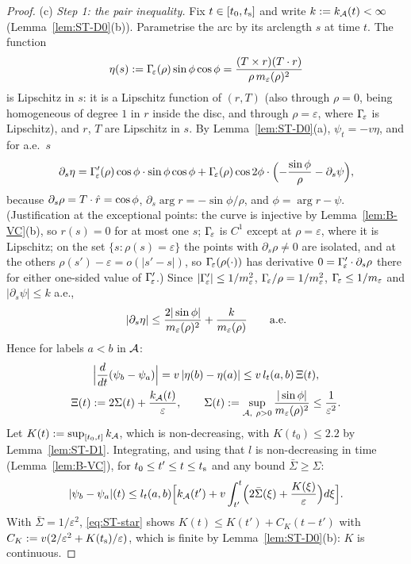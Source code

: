 \begin{proof}
(c) \emph{Step 1: the pair inequality.} Fix $t\in[t_0,t_{\mathrm s}]$ and write $k:=k_{\mathcal A}(t)<\infty$ (Lemma~\ref{lem:ST-D0}(b)).
Parametrise the arc by its arclength $s$ at time $t$. The function
\[
\eta(s):=\Gamma_{\!\varepsilon}(\rho)\sin\phi\cos\phi=\frac{(T\times r)(T\cdot r)}{\rho\,m_\varepsilon(\rho)^2}
\]
is Lipschitz in $s$: it is a Lipschitz function of $(r,T)$ (also through $\rho=0$, being homogeneous of degree $1$ in $r$ inside
the disc, and through $\rho=\varepsilon$, where $\Gamma_{\!\varepsilon}$ is Lipschitz), and $r$, $T$ are Lipschitz in $s$. By
Lemma~\ref{lem:ST-D0}(a), $\psi_t=-v\eta$, and for a.e.\ $s$
\[
\partial_s\eta=\Gamma_{\!\varepsilon}'(\rho)\cos\phi\cdot\sin\phi\cos\phi+\Gamma_{\!\varepsilon}(\rho)\cos2\phi\cdot\Bigl(-\frac{\sin\phi}\rho-\partial_s\psi\Bigr),
\]
because $\partial_s\rho=T\cdot\hat r=\cos\phi$, $\partial_s\arg r=-\sin\phi/\rho$, and $\phi=\arg r-\psi$. (Justification at the
exceptional points: the curve is injective by Lemma~\ref{lem:B-VC}(b), so $r(s)=0$ for at most one $s$; $\Gamma_{\!\varepsilon}$ is $C^1$ except at
$\rho=\varepsilon$, where it is Lipschitz; on the set $\{s:\rho(s)=\varepsilon\}$ the points with $\partial_s\rho\ne0$ are isolated,
and at the others $\rho(s')-\varepsilon=o(|s'-s|)$, so $\Gamma_{\!\varepsilon}(\rho(\cdot))$ has derivative $0=\Gamma_{\!\varepsilon}'\cdot\partial_s\rho$ there for
either one-sided value of $\Gamma_{\!\varepsilon}'$.) Since $|\Gamma_{\!\varepsilon}'|\le1/m_\varepsilon^2$, $\Gamma_{\!\varepsilon}/\rho=1/m_\varepsilon^2$, $\Gamma_{\!\varepsilon}\le1/m_\varepsilon$ and
$|\partial_s\psi|\le k$ a.e.,
\[
|\partial_s\eta|\le\frac{2|\sin\phi|}{m_\varepsilon(\rho)^2}+\frac k{m_\varepsilon(\rho)}\qquad\text{a.e.}
\]
Hence for labels $a<b$ in $\mathcal A$:
\begin{gather*}
\Bigl|\frac d{dt}(\psi_b-\psi_a)\Bigr|=v\,|\eta(b)-\eta(a)|\le v\,l_t(a,b)\,\Xi(t),\\
\Xi(t):=2\Sigma(t)+\frac{k_{\STcA}(t)}\varepsilon,\qquad
\Sigma(t):=\sup_{\STcA,\ \rho>0}\frac{|\sin\phi|}{\STme(\rho)^2}\le\frac1{\varepsilon^2}.
\end{gather*}
Let $K(t):=\sup_{[t_0,t]}k_{\mathcal A}$, which is non-decreasing, with $K(t_0)\le2.2$ by Lemma~\ref{lem:ST-D1}. Integrating, and using
that $l$ is non-decreasing in time (Lemma~\ref{lem:B-VC}), for $t_0\le t'\le t\le t_{\mathrm s}$ and any bound $\bar\Sigma\ge\Sigma$:
\begin{equation}\label{eq:ST-star}
|\psi_b-\psi_a|(t)\le l_t(a,b)\Bigl[k_{\mathcal A}(t')+v\int_{t'}^t\Bigl(2\bar\Sigma(\xi)+\frac{K(\xi)}\varepsilon\Bigr)d\xi\Bigr].
\end{equation}
With $\bar\Sigma=1/\varepsilon^2$, \eqref{eq:ST-star} shows $K(t)\le K(t')+C_K(t-t')$ with
$C_K:=v(2/\varepsilon^2+K(t_{\mathrm s})/\varepsilon)$, which is finite by Lemma~\ref{lem:ST-D0}(b): $K$ is continuous.


\end{proof}
